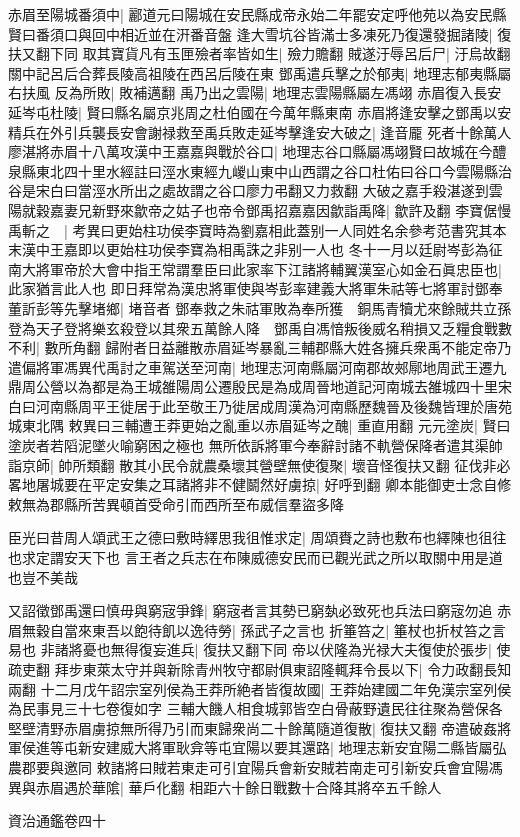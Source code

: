 赤眉至陽城番須中|{
	酈道元曰陽城在安民縣成帝永始二年罷安定呼他苑以為安民縣賢曰番須口與回中相近並在汧番音盤}
逢大雪坑谷皆滿士多凍死乃復還發掘諸陵|{
	復扶又翻下同}
取其寶貨凡有玉匣殮者率皆如生|{
	殮力贍翻}
賊遂汙辱呂后尸|{
	汙烏故翻關中記呂后合葬長陵高祖陵在西呂后陵在東}
鄧禹遣兵擊之於郁夷|{
	地理志郁夷縣屬右扶風}
反為所敗|{
	敗補邁翻}
禹乃出之雲陽|{
	地理志雲陽縣屬左馮翊}
赤眉復入長安延岑屯杜陵|{
	賢曰縣名屬京兆周之杜伯國在今萬年縣東南}
赤眉將逢安擊之鄧禹以安精兵在外引兵襲長安會謝禄救至禹兵敗走延岑擊逢安大破之|{
	逢音龎}
死者十餘萬人廖湛將赤眉十八萬攻漢中王嘉嘉與戰於谷口|{
	地理志谷口縣屬馮翊賢曰故城在今醴泉縣東北四十里水經註曰涇水東經九嵕山東中山西謂之谷口杜佑曰谷口今雲陽縣治谷是宋白曰當涇水所出之處故謂之谷口廖力弔翻又力救翻}
大破之嘉手殺湛遂到雲陽就穀嘉妻兄新野來歙帝之姑子也帝令鄧禹招嘉嘉因歙詣禹降|{
	歙許及翻}
李寶倨慢禹斬之　|{
	考異曰更始柱功侯李寶時為劉嘉相此蓋别一人同姓名余參考范書究其本末漢中王嘉即以更始柱功侯李寶為相禹誅之非别一人也}
冬十一月以廷尉岑彭為征南大將軍帝於大會中指王常謂羣臣曰此家率下江諸將輔翼漢室心如金石眞忠臣也|{
	此家猶言此人也}
即日拜常為漢忠將軍使與岑彭率建義大將軍朱祜等七將軍討鄧奉董訢彭等先擊堵鄉|{
	堵音者}
鄧奉救之朱祜軍敗為奉所獲　銅馬青犢尤來餘賊共立孫登為天子登將樂玄殺登以其衆五萬餘人降　鄧禹自馮愔叛後威名稍損又乏糧食戰數不利|{
	數所角翻}
歸附者日益離散赤眉延岑暴亂三輔郡縣大姓各擁兵衆禹不能定帝乃遣偏將軍馮異代禹討之車駕送至河南|{
	地理志河南縣屬河南郡故郟鄏地周武王遷九鼎周公營以為都是為王城雒陽周公遷殷民是為成周晉地道記河南城去雒城四十里宋白曰河南縣周平王徙居于此至敬王乃徙居成周漢為河南縣歷魏晉及後魏皆理於唐苑城東北隅}
敕異曰三輔遭王莽更始之亂重以赤眉延岑之醜|{
	重直用翻}
元元塗炭|{
	賢曰塗炭者若䧟泥墜火喻窮困之極也}
無所依訴將軍今奉辭討諸不軌營保降者遣其渠帥詣京師|{
	帥所類翻}
散其小民令就農桑壞其營壁無使復聚|{
	壞音怪復扶又翻}
征伐非必畧地屠城要在平定安集之耳諸將非不健鬬然好虜掠|{
	好呼到翻}
卿本能御吏士念自修敕無為郡縣所苦異頓首受命引而西所至布威信羣盜多降

臣光曰昔周人頌武王之德曰敷時繹思我徂惟求定|{
	周頌賚之詩也敷布也繹陳也徂往也求定謂安天下也}
言王者之兵志在布陳威德安民而已觀光武之所以取關中用是道也豈不美哉

又詔徵鄧禹還曰慎毋與窮宼爭鋒|{
	窮宼者言其勢已窮埶必致死也兵法曰窮宼勿追}
赤眉無穀自當來東吾以飽待飢以逸待勞|{
	孫武子之言也}
折箠笞之|{
	箠杖也折杖笞之言易也}
非諸將憂也無得復妄進兵|{
	復扶又翻下同}
帝以伏隆為光禄大夫復使於張步|{
	使疏吏翻}
拜步東萊太守并與新除青州牧守都尉俱東詔隆輒拜令長以下|{
	令力政翻長知兩翻}
十二月戊午詔宗室列侯為王莽所絶者皆復故國|{
	王莽始建國二年免漢宗室列侯為民事見三十七卷復如字}
三輔大饑人相食城郭皆空白骨蔽野遺民往往聚為營保各堅壁清野赤眉虜掠無所得乃引而東歸衆尚二十餘萬隨道復散|{
	復扶又翻}
帝遣破姦將軍侯進等屯新安建威大將軍耿弇等屯宜陽以要其還路|{
	地理志新安宜陽二縣皆屬弘農郡要與邀同}
敕諸將曰賊若東走可引宜陽兵會新安賊若南走可引新安兵會宜陽馮異與赤眉遇於華隂|{
	華戶化翻}
相距六十餘日戰數十合降其將卒五千餘人

資治通鑑卷四十

